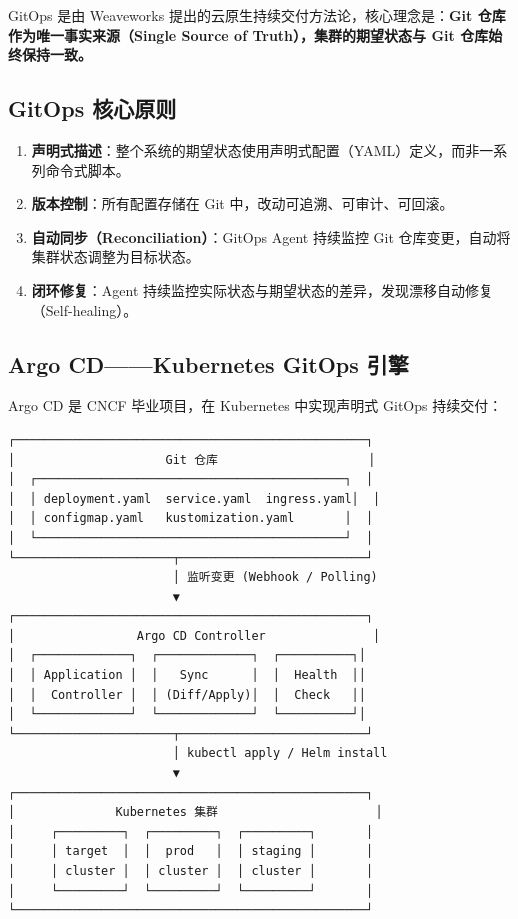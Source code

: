 \documentclass[12pt,UTF8]{ctexbook}
\begin{document}
GitOps 是由 Weaveworks 提出的云原生持续交付方法论，核心理念是：\textbf{Git 仓库作为唯一事实来源（Single Source of Truth），集群的期望状态与 Git 仓库始终保持一致。}

\subsection*{GitOps 核心原则}

\begin{enumerate}
    \item \textbf{声明式描述}：整个系统的期望状态使用声明式配置（YAML）定义，而非一系列命令式脚本。
    \item \textbf{版本控制}：所有配置存储在 Git 中，改动可追溯、可审计、可回滚。
    \item \textbf{自动同步（Reconciliation）}：GitOps Agent 持续监控 Git 仓库变更，自动将集群状态调整为目标状态。
    \item \textbf{闭环修复}：Agent 持续监控实际状态与期望状态的差异，发现漂移自动修复（Self-healing）。
\end{enumerate}

\subsection*{Argo CD——Kubernetes GitOps 引擎}

Argo CD 是 CNCF 毕业项目，在 Kubernetes 中实现声明式 GitOps 持续交付：

\begin{lstlisting}
┌─────────────────────────────────────────────────┐
│                     Git 仓库                     │
│  ┌───────────────────────────────────────────┐  │
│  │ deployment.yaml  service.yaml  ingress.yaml│  │
│  │ configmap.yaml   kustomization.yaml       │  │
│  └───────────────────────────────────────────┘  │
└──────────────────────┬──────────────────────────┘
                       │ 监听变更 (Webhook / Polling)
                       ▼
┌─────────────────────────────────────────────────┐
│                 Argo CD Controller               │
│  ┌─────────────┐  ┌─────────────┐  ┌──────────┐│
│  │ Application │  │   Sync      │  │  Health  ││
│  │  Controller │  │ (Diff/Apply)│  │  Check   ││
│  └─────────────┘  └─────────────┘  └──────────┘│
└──────────────────────┬──────────────────────────┘
                       │ kubectl apply / Helm install
                       ▼
┌─────────────────────────────────────────────────┐
│              Kubernetes 集群                      │
│     ┌─────────┐  ┌─────────┐  ┌─────────┐       │
│     │ target  │  │  prod   │  │ staging │       │
│     │ cluster │  │ cluster │  │ cluster │       │
│     └─────────┘  └─────────┘  └─────────┘       │
└─────────────────────────────────────────────────┘
\end{lstlisting}
\end{document}
